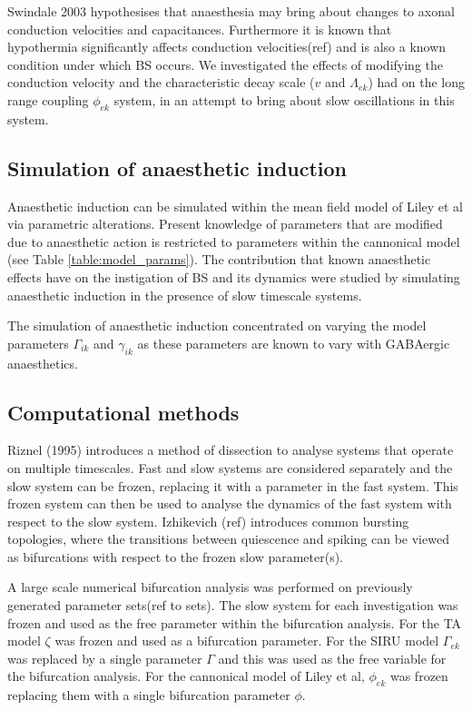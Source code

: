 \documentclass[a4paper,12pt]{article}
\begin{document}
Swindale 2003 hypothesises that anaesthesia may bring about changes to axonal conduction velocities and capacitances. Furthermore it is known that hypothermia significantly affects conduction velocities(ref) and is also a known condition under which BS occurs. We investigated the
effects of modifying the conduction velocity and the characteristic decay scale ($v$ and $\Lambda_{ek}$) had on the
long range coupling $\phi_{ek}$ system, in an attempt to bring about slow oscillations in this system.

\subsection{Simulation of anaesthetic induction}
Anaesthetic induction can be simulated within the mean field model of Liley et al via parametric alterations. Present knowledge of parameters that are modified due to anaesthetic action is restricted to parameters within the cannonical model (see Table \ref{table:model_params}). The contribution that known anaesthetic effects have on the instigation of BS and its dynamics were studied by simulating anaesthetic induction in the presence of slow timescale systems. 

The simulation of anaesthetic induction concentrated on varying the model parameters $\Gamma_{ik}$ and $\gamma_{ik}$ as these parameters are known to vary with GABAergic anaesthetics. 

\subsection{Computational methods}
Riznel (1995) introduces a method of dissection to analyse systems that operate on multiple timescales. Fast and slow systems are considered separately and the slow system can be frozen, replacing it with a parameter in the fast system. This frozen system can then be used to analyse the dynamics of the fast system with respect to the slow system. Izhikevich (ref) introduces common bursting topologies, where the transitions between quiescence and spiking can be viewed as bifurcations with respect to the frozen slow parameter(s).

A large scale numerical bifurcation analysis was performed on previously generated parameter sets(ref to sets). The slow system for each investigation was frozen and used as the free parameter within the bifurcation analysis. For the TA model $\zeta$ was frozen and used as a bifurcation parameter. For the SIRU model $\Gamma_{ek}$ was replaced by a single parameter $\Gamma$ and this was used as the free variable for the bifurcation analysis. For the cannonical model of Liley et al, $\phi_{ek}$ was frozen replacing them with a single bifurcation parameter $\phi$.
\end{document}
